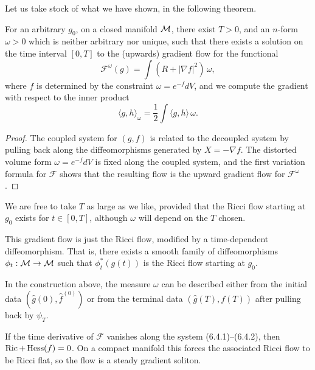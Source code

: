 Let us take stock of what we have shown, in the following theorem.

\begin{theorem}
\label{topping-gradient-flow-gradient-flow-formulation}
For an arbitrary $g_0$, on a closed manifold $\mathcal{M}$, there exist $T>0$, and an $n$-form $\omega>0$ which is neither arbitrary nor unique, such that there exists a solution on the time interval $[0,T]$ to the (upwards) gradient flow for the functional
\[
\mathcal F^\omega(g)=\int (R+\lvert \nabla f\rvert^2)\,\omega,
\]
where $f$ is determined by the constraint $\omega=e^{-f}dV$, and we compute the gradient with respect to the inner product
\[
\langle g,h\rangle_\omega=\frac12 \int \langle g,h\rangle\,\omega.
\]
\end{theorem}

\begin{proof}
The coupled system for $(g,f)$ is related to the decoupled system by pulling back along the diffeomorphisms generated by $X=-\nabla f$. The distorted volume form $\omega=e^{-f}dV$ is fixed along the coupled system, and the first variation formula for $\mathcal F$ shows that the resulting flow is the upward gradient flow for $\mathcal F^\omega$.
\end{proof}

We are free to take $T$ as large as we like, provided that the Ricci flow starting at $g_0$ exists for $t\in[0,T]$, although $\omega$ will depend on the $T$ chosen.

This gradient flow is just the Ricci flow, modified by a time-dependent diffeomorphism. That is, there exists a smooth family of diffeomorphisms $\phi_t:\mathcal{M}\to\mathcal{M}$ such that $\phi_t^*(g(t))$ is the Ricci flow starting at $g_0$.

\begin{remark}
\label{topping-gradient-flow-volume-preserving-remark}
In the construction above, the measure $\omega$ can be described either from the initial data $(\hat g(0),\hat f^{(0)})$ or from the terminal data $(\hat g(T),f(T))$ after pulling back by $\psi_T$.
\end{remark}

\begin{remark}
\label{topping-gradient-flow-steady-soliton-criterion}
If the time derivative of $\mathcal F$ vanishes along the system (6.4.1)--(6.4.2), then $\operatorname{Ric}+\operatorname{Hess}(f)=0$. On a compact manifold this forces the associated Ricci flow to be Ricci flat, so the flow is a steady gradient soliton.
\end{remark}


